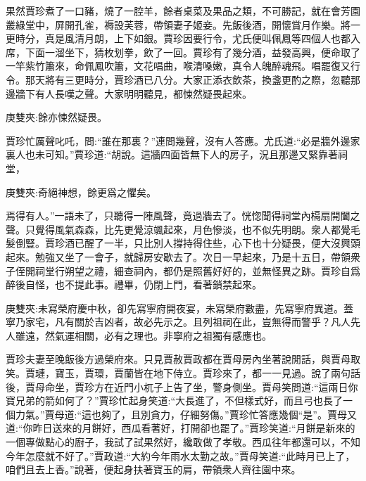 \begin{parag}
    果然賈珍煮了一口豬，燒了一腔羊，餘者桌菜及果品之類，不可勝記，就在會芳園叢綠堂中，屏開孔雀，褥設芙蓉，帶領妻子姬妾。先飯後酒，開懷賞月作樂。將一更時分，真是風清月朗，上下如銀。賈珍因要行令，尤氏便叫佩鳳等四個人也都入席，下面一溜坐下，猜枚划拳，飲了一回。賈珍有了幾分酒，益發高興，便命取了一竿紫竹簫來，命佩鳳吹簫，文花唱曲，喉清嗓嫩，真令人魄醉魂飛。唱罷復又行令。那天將有三更時分，賈珍酒已八分。大家正添衣飲茶，換盞更酌之際，忽聽那邊牆下有人長嘆之聲。大家明明聽見，都悚然疑畏起來。\begin{note}庚雙夾:餘亦悚然疑畏。\end{note}賈珍忙厲聲叱吒，問:“誰在那裏？”連問幾聲，沒有人答應。尤氏道:“必是牆外邊家裏人也未可知。”賈珍道:“胡說。這牆四面皆無下人的房子，況且那邊又緊靠著祠堂，\begin{note}庚雙夾:奇絕神想，餘更爲之懼矣。\end{note}焉得有人。”一語未了，只聽得一陣風聲，竟過牆去了。恍惚聞得祠堂內槅扇開闔之聲。只覺得風氣森森，比先更覺涼颯起來，月色慘淡，也不似先明朗。衆人都覺毛髮倒豎。賈珍酒已醒了一半，只比別人撐持得住些，心下也十分疑畏，便大沒興頭起來。勉強又坐了一會子，就歸房安歇去了。次日一早起來，乃是十五日，帶領衆子侄開祠堂行朔望之禮，細查祠內，都仍是照舊好好的，並無怪異之跡。賈珍自爲醉後自怪，也不提此事。禮畢，仍閉上門，看著鎖禁起來。\begin{note}庚雙夾:未寫榮府慶中秋，卻先寫寧府開夜宴，未寫榮府數盡，先寫寧府異道。蓋寧乃家宅，凡有關於吉凶者，故必先示之。且列祖祠在此，豈無得而警乎？凡人先人雖遠，然氣運相關，必有之理也。非寧府之祖獨有感應也。\end{note}
\end{parag}


\begin{parag}
    賈珍夫妻至晚飯後方過榮府來。只見賈赦賈政都在賈母房內坐著說閒話，與賈母取笑。賈璉，寶玉，賈環，賈蘭皆在地下侍立。賈珍來了，都一一見過。說了兩句話後，賈母命坐，賈珍方在近門小杌子上告了坐，警身側坐。賈母笑問道:“這兩日你寶兄弟的箭如何了？”賈珍忙起身笑道:“大長進了，不但樣式好，而且弓也長了一個力氣。”賈母道:“這也夠了，且別貪力，仔細努傷。”賈珍忙答應幾個“是”。賈母又道:“你昨日送來的月餅好，西瓜看著好，打開卻也罷了。”賈珍笑道:“月餅是新來的一個專做點心的廚子，我試了試果然好，纔敢做了孝敬。西瓜往年都還可以，不知今年怎麼就不好了。”賈政道:“大約今年雨水太勤之故。”賈母笑道:“此時月已上了，咱們且去上香。”說著，便起身扶著寶玉的肩，帶領衆人齊往園中來。
\end{parag}


